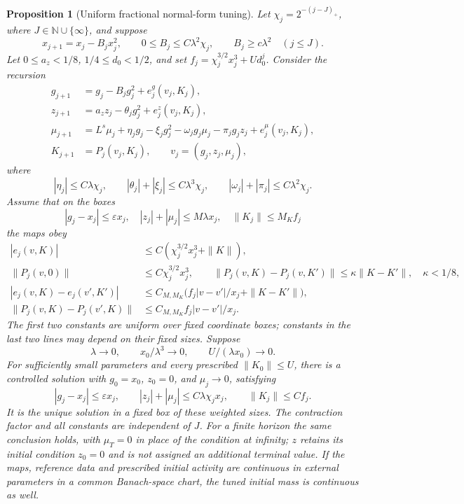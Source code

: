 \documentclass[11pt]{article}
\newtheorem{proposition}{Proposition}[section]
\begin{document}
\begin{proposition}[Uniform fractional normal-form tuning]
\label{frac:prop:recursion}
Let \(\chi_j=2^{-(j-J)_+}\), where
\(J\in\mathbb N\cup\{\infty\}\), and suppose
\[
 x_{j+1}=x_j-B_jx_j^2,\qquad
 0\le B_j\le C\lambda^2\chi_j,\qquad
 B_j\ge c\lambda^2\quad(j\le J).
\]
Let \(0\le a_z<1/8\), \(1/4\le d_0<1/2\), and set
\(f_j=\chi_j^{3/2}x_j^3+Ud_0^j\).
Consider the recursion
\begin{align*}
 g_{j+1}&=g_j-B_jg_j^2+e_j^g(v_j,K_j),\\
 z_{j+1}&=a_z z_j-\theta_jg_j^2+e_j^z(v_j,K_j),\\
 \mu_{j+1}&=L^s\mu_j+\eta_jg_j-\xi_jg_j^2
       -\omega_jg_j\mu_j-\pi_jg_jz_j+e_j^\mu(v_j,K_j),\\
 K_{j+1}&=P_j(v_j,K_j),\qquad v_j=(g_j,z_j,\mu_j),
\end{align*}
where
\[
 |\eta_j|\le C\lambda\chi_j,\qquad
 |\theta_j|+|\xi_j|\le C\lambda^3\chi_j,\qquad
 |\omega_j|+|\pi_j|\le C\lambda^2\chi_j.
\]
Assume that on the boxes
\[
 |g_j-x_j|\le\varepsilon x_j,\quad
 |z_j|+|\mu_j|\le M\lambda x_j,\quad
 \|K_j\|\le M_K f_j
\]
the maps obey
\begin{align*}
 |e_j(v,K)|&\le C(\chi_j^{3/2}x_j^3+\|K\|),\\
 \|P_j(v,0)\|&\le C\chi_j^{3/2}x_j^3,\qquad
 \|P_j(v,K)-P_j(v,K')\|\le\kappa\|K-K'\|,
                    \quad \kappa<1/8,\\
 |e_j(v,K)-e_j(v',K')|
   &\le C_{M,M_K}\bigl(f_j|v-v'|/x_j+\|K-K'\|\bigr),\\
 \|P_j(v,K)-P_j(v',K)\|
   &\le C_{M,M_K}f_j|v-v'|/x_j.
\end{align*}
The first two constants are uniform over fixed coordinate boxes;
constants in the last two lines may depend on their fixed sizes.
Suppose
\[
 \lambda\to0,\qquad x_0/\lambda^3\to0,\qquad
 U/(\lambda x_0)\to0.
\]
For sufficiently small parameters and every prescribed
\(\|K_0\|\le U\), there is a controlled solution with
\(g_0=x_0\), \(z_0=0\), and \(\mu_j\to0\), satisfying
\[
 |g_j-x_j|\le\varepsilon x_j,\qquad
 |z_j|+|\mu_j|\le C\lambda\chi_j x_j,\qquad
 \|K_j\|\le C f_j.
\]
It is the unique solution in a fixed box of these weighted sizes.
The contraction factor and all constants are independent of \(J\).
For a finite horizon the same conclusion holds, with \(\mu_T=0\)
in place of the condition at infinity; \(z\) retains its initial
condition \(z_0=0\) and is not assigned an additional terminal value.
If the maps, reference data and prescribed initial activity are
continuous in external parameters in a common Banach-space chart,
the tuned initial mass is continuous as well.
\end{proposition}
\end{document}
